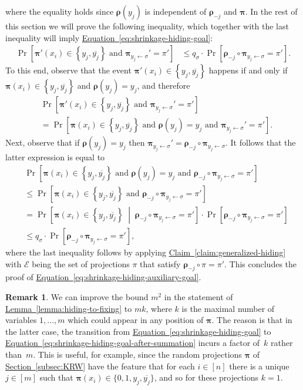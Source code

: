 \documentclass[11pt]{article}
\numberwithin{equation}{section}
\theoremstyle{definition}
\newtheorem{remark}[theorem]{Remark}
\theoremstyle{plain}
\newcommand{\expref}[2]{\hyperref[#2]{#1~\ref{#2}}}
\theoremstyle{definition}\newtheorem{notation}[theorem]{Notation}\theoremstyle{plain}
\newcommand{\p}{\boldsymbol{\pi}}
\newcommand{\rs}{\boldsymbol{\rho}}
\newcommand{\cbE}{\boldsymbol{\mathcal{E}}}
\theoremstyle{definition}
\theoremstyle{plain}
\begin{document}
where the equality holds since $\rs(y_{j})$ is independent of $\rs_{-j}$
and $\p$. In the rest of this section we will prove the following
inequality, which together with the last inequality will imply \expref{Equation}{eq:shrinkage-hiding-goal}:
\begin{align}
\Pr\!\left[\p'(x_{i})\in\left\{ y_{j},\overline{y_{j}}\right\} \text{ and }\p_{y_{j}\gets\sigma}'=\pi'\right] & \le q_{\sigma}\cdot\Pr\!\left[\rs_{-j}\circ\p_{y_{j}\gets\sigma}=\pi'\right].\label{eq:shrinkage-hiding-auxiliary-goal}
\end{align}
To this end, observe that the event $\p'(x_{i})\in\left\{ y_{j},\overline{y_{j}}\right\} $
happens if and only if $\p(x_{i})\in\left\{ y_{j},\overline{y_{j}}\right\} $
and $\rs(y_{j})=y_{j}$, and therefore 
\begin{align*}
 & \Pr\!\left[\p'(x_{i})\in\left\{ y_{j},\overline{y_{j}}\right\} \text{ and }\p_{y_{j}\gets\sigma}'=\pi'\right]\\
 & =\Pr\!\left[\p(x_{i})\in\left\{ y_{j},\overline{y_{j}}\right\} \text{ and }\rs(y_{j})=y_{j}\text{ and }\p_{y_{j}\gets\sigma}'=\pi'\right].
\end{align*}
Next, observe that if $\rs(y_{j})=y_{j}$ then $\p_{y_{j}\gets\sigma}'=\rs_{-j}\circ\p_{y_{j}\gets\sigma}$.
It follows that the latter expression is equal to 
\begin{align*}
 & \Pr\!\left[\p(x_{i})\in\left\{ y_{j},\overline{y_{j}}\right\} \text{ and }\rs(y_{j})=y_{j}\text{ and }\rs_{-j}\circ\p_{y_{j}\gets\sigma}=\pi'\right]\\
 & \le\Pr\!\left[\p(x_{i})\in\left\{ y_{j},\overline{y_{j}}\right\} \text{ and }\rs_{-j}\circ\p_{y_{j}\gets\sigma}=\pi'\right]\\
 & =\Pr\!\left[\p(x_{i})\in\left\{ y_{j},\overline{y_{j}}\right\} \;\middle|\;\rs_{-j}\circ\p_{y_{j}\gets\sigma}=\pi'\right]\cdot\Pr\!\left[\rs_{-j}\circ\p_{y_{j}\gets\sigma}=\pi'\right]\\
 & \le q_{\sigma}\cdot\Pr\!\left[\rs_{-j}\circ\p_{y_{j}\gets\sigma}=\pi'\right],
\end{align*}
where the last inequality follows by applying \expref{Claim}{claim:generalized-hiding}
with $\cbE$ being the set of projections $\pi$ that satisfy $\rs_{-j}\circ\pi=\pi'$.
This concludes the proof of \expref{Equation}{eq:shrinkage-hiding-auxiliary-goal}.
\begin{remark}
We can improve the bound $m^{2}$ in the statement of \expref{Lemma}{lemma:hiding-to-fixing}
to $mk$, where $k$ is the maximal number of variables $1,\ldots,m$
which could appear in any position of $\p$. The reason is that in
the latter case, the transition from \expref{Equation}{eq:shrinkage-hiding-goal}
to \expref{Equation}{eq:shrinkage-hiding-goal-after-summation} incurs a factor
of~$k$ rather than~$m$. This is useful, for example, since the
random projections $\p$ of \expref{Section}{subsec:KRW} have the feature that
for each $i\in[n]$ there is a unique $j\in[m]$ such that $\p(x_{i})\in\{0,1,y_{j},\overline{y_{j}}\}$,
and so for these projections $k=1$. 
\end{remark}
\end{document}
